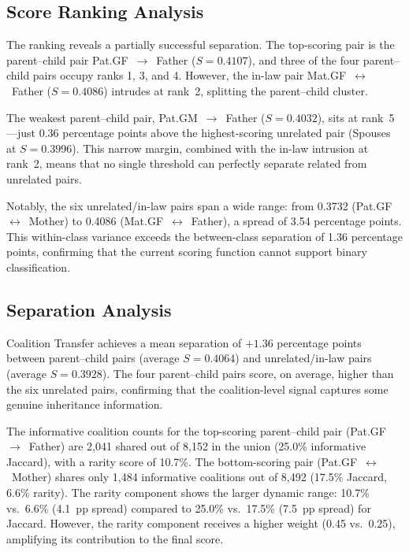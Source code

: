 \documentclass{../yalumba}
\begin{document}
\subsection{Score Ranking Analysis}
\label{sec:results-ranking}

The ranking reveals a partially successful separation.  The top-scoring pair
is the parent--child pair Pat.GF~$\to$~Father ($S = 0.4107$), and three of
the four parent--child pairs occupy ranks 1, 3, and 4.  However, the in-law
pair Mat.GF~$\leftrightarrow$~Father ($S = 0.4086$) intrudes at rank~2,
splitting the parent--child cluster.

The weakest parent--child pair, Pat.GM~$\to$~Father ($S = 0.4032$), sits at
rank~5---just 0.36 percentage points above the highest-scoring unrelated pair
(Spouses at $S = 0.3996$).  This narrow margin, combined with the in-law
intrusion at rank~2, means that no single threshold can perfectly separate
related from unrelated pairs.


Notably, the six unrelated/in-law pairs span a wide range: from 0.3732
(Pat.GF~$\leftrightarrow$~Mother) to 0.4086 (Mat.GF~$\leftrightarrow$~Father),
a spread of 3.54 percentage points.  This within-class variance exceeds the
between-class separation of 1.36 percentage points, confirming that the
current scoring function cannot support binary classification.

\subsection{Separation Analysis}
\label{sec:results-separation}

\begin{keyfinding}
Coalition Transfer achieves a mean separation of $+1.36$ percentage points
between parent--child pairs (average $S = 0.4064$) and unrelated/in-law pairs
(average $S = 0.3928$).  The four parent--child pairs score, on average,
higher than the six unrelated pairs, confirming that the coalition-level
signal captures some genuine inheritance information.
\end{keyfinding}

The informative coalition counts for the top-scoring parent--child pair
(Pat.GF~$\to$~Father) are 2{,}041 shared out of 8{,}152 in the union (25.0\%
informative Jaccard), with a rarity score of 10.7\%.  The bottom-scoring
pair (Pat.GF~$\leftrightarrow$~Mother) shares only 1{,}484 informative
coalitions out of 8{,}492 (17.5\% Jaccard, 6.6\% rarity).  The rarity
component shows the larger dynamic range: 10.7\% vs.\ 6.6\% (4.1~pp spread)
compared to 25.0\% vs.\ 17.5\% (7.5~pp spread) for Jaccard.  However, the
rarity component receives a higher weight (0.45 vs.\ 0.25), amplifying its
contribution to the final score.
\end{document}
